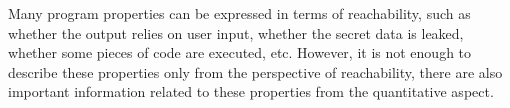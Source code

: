  
Many program properties can be expressed in terms of reachability,
such as
whether the output relies on user input, whether the secret data is leaked, 
whether some pieces of code are executed, etc.
However, it is not enough to describe these properties only
from the perspective of reachability,
there are also
important information related to these properties from the quantitative aspect.
